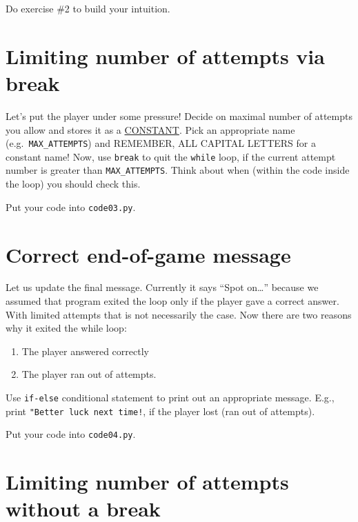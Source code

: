 \documentclass[
]{book}
\providecommand{\tightlist}{%
  \setlength{\itemsep}{0pt}\setlength{\parskip}{0pt}}
\begin{document}
Do exercise \#2 to build your intuition.

\hypertarget{limiting-number-of-attempts-via-break}{%
\section{Limiting number of attempts via break}\label{limiting-number-of-attempts-via-break}}

Let's put the player under some pressure! Decide on maximal number of attempts you allow and stores it as a \protect\hyperlink{constants}{CONSTANT}. Pick an appropriate name (e.g.~\texttt{MAX\_ATTEMPTS}) and REMEMBER, ALL CAPITAL LETTERS for a constant name! Now, use \texttt{break} to quit the \texttt{while} loop, if the current attempt number is greater than \texttt{MAX\_ATTEMPTS}. Think about when (within the code inside the loop) you should check this.

Put your code into \texttt{code03.py}.

\hypertarget{correct-end-of-game-message}{%
\section{Correct end-of-game message}\label{correct-end-of-game-message}}

Let us update the final message. Currently it says ``Spot on\ldots{}'' because we assumed that program exited the loop only if the player gave a correct answer. With limited attempts that is not necessarily the case. Now there are two reasons why it exited the while loop:

\begin{enumerate}
\def\labelenumi{\arabic{enumi}.}
\tightlist
\item
  The player answered correctly
\item
  The player ran out of attempts.
\end{enumerate}

Use \texttt{if-else} conditional statement to print out an appropriate message. E.g., print \texttt{"Better\ luck\ next\ time!}, if the player lost (ran out of attempts).

Put your code into \texttt{code04.py}.

\hypertarget{limiting-number-of-attempts-without-a-break}{%
\section{Limiting number of attempts without a break}\label{limiting-number-of-attempts-without-a-break}}
\end{document}
